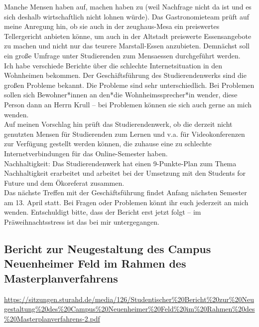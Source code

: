 Manche Mensen haben auf, machen haben zu (weil Nachfrage nicht da ist und es sich deshalb wirtschaftlich nicht lohnen würde). Das Gastronomieteam prüft auf meine Anregung hin, ob sie auch in der zeughaus-Mesa ein preiswertes Tellergericht anbieten könne, um auch in der Altstadt preiswerte Essensangebote zu machen und nicht nur das teurere Marstall-Essen anzubieten. Demnächst soll ein große Umfrage unter Studierenden zum Mensaessen durchgeführt werden.\\
Ich habe verschiede Berichte über die schlechte Internetsituation in den Wohnheimen bekommen. Der Geschäftsführung des Studierendenwerks sind die großen Probleme bekannt. Die Probleme sind sehr unterschiedlich. Bei Problemen sollen sich Bewohner*innen an den*die Wohnheimssprecher*in wender, diese Person dann an Herrn Krull – bei Problemen können sie sich auch gerne an mich wenden.\\
Auf meinen Vorschlag hin prüft das Studierendenwerk, ob die derzeit nicht genutzten Mensen für Studierenden zum Lernen und v.a. für Videokonferenzen zur Verfügung gestellt werden können, die zuhause eine zu schlechte Internetverbindungen für das Online-Semester haben.\\
Nachhaltigkeit: Das Studierendenwerk hat einen 9-Punkte-Plan zum Thema Nachhaltigkeit erarbeitet und arbeitet bei der Umsetzung mit den Students for Future und dem Ökoreferat zusammen.\\
Das nächste Treffen mit der Geschäftsführung findet Anfang nächsten Semester am 13. April statt. Bei Fragen oder Problemen könnt ihr euch jederzeit an mich wenden. Entschuldigt bitte, dass der Bericht erst jetzt folgt – im Präweihnachtsstress ist das bei mir untergegangen.

\subsection{Bericht zur Neugestaltung des Campus Neuenheimer Feld im Rahmen des Masterplanverfahrens}
\url{https://sitzungen.sturahd.de/media/126/Studentischer%20Bericht%20zur%20Neugestaltung%20des%20Campus%20Neuenheimer%20Feld%20im%20Rahmen%20des%20Masterplanverfahrens-2.pdf}
